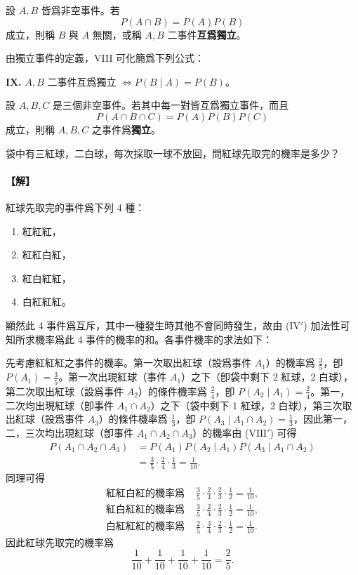 \medskip
\begin{definition*}
設 $A, B$ 皆爲非空事件。若
\[
P(A \cap B) = P(A) P(B)
\]
成立，則稱 $B$ 與 $A$ 無關，或稱 $A, B$ 二事件\textbf{互爲獨立}。
\end{definition*}

由獨立事件的定義，VIII 可化簡爲下列公式：

\medskip
\noindent\textbf{IX.} $A, B$ 二事件互爲獨立 $\Longleftrightarrow P(B \mid A) = P(B)$。

\medskip
\begin{definition*}
設 $A, B, C$ 是三個非空事件。若其中每一對皆互爲獨立事件，而且
\[
P(A \cap B \cap C) = P(A) P(B) P(C)
\]
成立，則稱 $A, B, C$ 之事件爲\textbf{獨立}。
\end{definition*}

\medskip
\begin{discussion}\label{disc:b5-3-3}
袋中有三紅球，二白球，每次採取一球不放回，問紅球先取完的機率是多少？
\end{discussion}
\paragraph{【解】}
紅球先取完的事件爲下列 4 種：
\begin{enumerate}[1.]
  \item 紅紅紅，
  \item 紅紅白紅，
  \item 紅白紅紅，
  \item 白紅紅紅。
\end{enumerate}
顯然此 4 事件爲互斥，其中一種發生時其他不會同時發生，故由 ($\text{IV}'$) 加法性可知所求機率爲此 4 事件的機率的和。各事件機率的求法如下：

先考慮紅紅紅之事件的機率。第一次取出紅球（設爲事件 $A_1$）的機率爲 $\frac{3}{5}$，卽 $P(A_1) = \frac{3}{5}$。第一次出現紅球（事件 $A_1$）之下（卽袋中剩下 2 紅球，2 白球），第二次取出紅球（設爲事件 $A_2$）的條件機率爲 $\frac{2}{4}$，卽 $P(A_2 \mid A_1) = \frac{2}{4}$。第一，二次均出現紅球（卽事件 $A_1 \cap A_2$）之下（袋中剩下 1 紅球，2 白球），第三次取出紅球（設爲事件 $A_3$）的條件機率爲 $\frac{1}{3}$，卽 $P(A_3 \mid A_1 \cap A_2) = \frac{1}{3}$，因此第一，二，三次均出現紅球（卽事件 $A_1 \cap A_2 \cap A_3$）的機率由 ($\text{VIII}'$) 可得
\begin{align*}
P(A_1 \cap A_2 \cap A_3) &= P(A_1) P(A_2 \mid A_1) P(A_3 \mid A_1 \cap A_2) \\
&= \frac{3}{5} \cdot \frac{2}{4} \cdot \frac{1}{3} = \frac{1}{10}.
\end{align*}
同理可得
\begin{align*}
\text{紅紅白紅的機率爲 } &\frac{3}{5} \cdot \frac{2}{4} \cdot \frac{2}{3} \cdot \frac{1}{2} = \frac{1}{10}, \\
\text{紅白紅紅的機率爲 } &\frac{3}{5} \cdot \frac{2}{4} \cdot \frac{2}{3} \cdot \frac{1}{2} = \frac{1}{10}, \\
\text{白紅紅紅的機率爲 } &\frac{2}{5} \cdot \frac{3}{4} \cdot \frac{2}{3} \cdot \frac{1}{2} = \frac{1}{10}.
\end{align*}
因此紅球先取完的機率爲
\[
\frac{1}{10} + \frac{1}{10} + \frac{1}{10} + \frac{1}{10} = \frac{2}{5}.
\]

